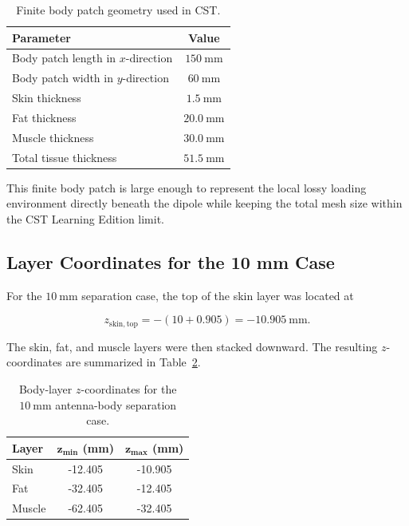 \begin{table}[htbp]
\centering
\caption{Finite body patch geometry used in CST.}
\label{tab:finite-body-patch-geometry}
\begin{tabular}{lc}
\hline
\textbf{Parameter} & \textbf{Value} \\
\hline
Body patch length in \(x\)-direction & \(150~\mathrm{mm}\) \\
Body patch width in \(y\)-direction & \(60~\mathrm{mm}\) \\
Skin thickness & \(1.5~\mathrm{mm}\) \\
Fat thickness & \(20.0~\mathrm{mm}\) \\
Muscle thickness & \(30.0~\mathrm{mm}\) \\
Total tissue thickness & \(51.5~\mathrm{mm}\) \\
\hline
\end{tabular}
\end{table}

This finite body patch is large enough to represent the local lossy loading environment directly beneath the dipole while keeping the total mesh size within the CST Learning Edition limit.

\subsection{Layer Coordinates for the 10 mm Case}

For the \(10~\mathrm{mm}\) separation case, the top of the skin layer was located at

\[
z_{\mathrm{skin,top}} = -(10+0.905)
=
-10.905~\mathrm{mm}.
\]

The skin, fat, and muscle layers were then stacked downward. The resulting \(z\)-coordinates are summarized in Table~\ref{tab:body-10mm-coordinates}.

\begin{table}[htbp]
\centering
\caption{Body-layer \(z\)-coordinates for the \(10~\mathrm{mm}\) antenna-body separation case.}
\label{tab:body-10mm-coordinates}
\begin{tabular}{lcc}
\hline
\textbf{Layer} & \(\boldsymbol{z_{\min}}\) \textbf{(mm)} & \(\boldsymbol{z_{\max}}\) \textbf{(mm)} \\
\hline
Skin & -12.405 & -10.905 \\
Fat & -32.405 & -12.405 \\
Muscle & -62.405 & -32.405 \\
\hline
\end{tabular}
\end{table}

